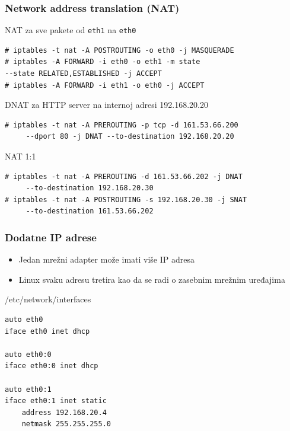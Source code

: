 \documentclass[t,table,usenames,dvipsnames]{beamer}
\begin{document}
\begin{frame}[fragile]
	\frametitle{Network address translation (NAT)}
	\small
	\begin{block}{NAT za sve pakete od \texttt{eth1} na \texttt{eth0}}
	\begin{verbatim}
# iptables -t nat -A POSTROUTING -o eth0 -j MASQUERADE
# iptables -A FORWARD -i eth0 -o eth1 -m state
--state RELATED,ESTABLISHED -j ACCEPT
# iptables -A FORWARD -i eth1 -o eth0 -j ACCEPT
	\end{verbatim}
	\end{block}
	\begin{block}{DNAT za HTTP server na internoj adresi 192.168.20.20}
	\begin{verbatim}
# iptables -t nat -A PREROUTING -p tcp -d 161.53.66.200 
     --dport 80 -j DNAT --to-destination 192.168.20.20
	\end{verbatim}
	\end{block}
	\begin{block}{NAT 1:1}
	\begin{verbatim}
# iptables -t nat -A PREROUTING -d 161.53.66.202 -j DNAT 
     --to-destination 192.168.20.30
# iptables -t nat -A POSTROUTING -s 192.168.20.30 -j SNAT
     --to-destination 161.53.66.202
	\end{verbatim}
	\end{block}
\end{frame}

\begin{frame}[fragile]
	\frametitle{Dodatne IP adrese}
	\begin{itemize}
		\item Jedan mrežni adapter može imati više IP adresa
		\item Linux svaku adresu tretira kao da se radi o zasebnim mrežnim uređajima
	\end{itemize}
	\begin{block}{/etc/network/interfaces} \footnotesize
	\begin{verbatim}
auto eth0
iface eth0 inet dhcp

auto eth0:0
iface eth0:0 inet dhcp

auto eth0:1
iface eth0:1 inet static
    address 192.168.20.4
    netmask 255.255.255.0
	\end{verbatim}
	\end{block}
\end{frame}
\end{document}

